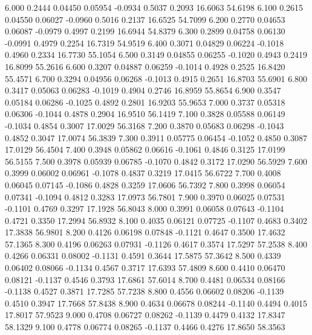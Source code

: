    6.000   0.2444   0.04450   0.05954  -0.0934   0.5037   0.2093  16.6063  54.6198
   6.100   0.2615   0.04550   0.06027  -0.0960   0.5016   0.2137  16.6525  54.7099
   6.200   0.2770   0.04653   0.06087  -0.0979   0.4997   0.2199  16.6944  54.8379
   6.300   0.2899   0.04758   0.06130  -0.0991   0.4979   0.2254  16.7319  54.9519
   6.400   0.3071   0.04829   0.06224  -0.1018   0.4960   0.2334  16.7730  55.1054
   6.500   0.3149   0.04855   0.06255  -0.1020   0.4943   0.2419  16.8099  55.2616
   6.600   0.3207   0.04887   0.06259  -0.1014   0.4928   0.2525  16.8420  55.4571
   6.700   0.3294   0.04956   0.06268  -0.1013   0.4915   0.2651  16.8703  55.6901
   6.800   0.3417   0.05063   0.06283  -0.1019   0.4904   0.2746  16.8959  55.8654
   6.900   0.3547   0.05184   0.06286  -0.1025   0.4892   0.2801  16.9203  55.9653
   7.000   0.3737   0.05318   0.06306  -0.1044   0.4878   0.2904  16.9510  56.1419
   7.100   0.3828   0.05588   0.06149  -0.1034   0.4854   0.3007  17.0029  56.3168
   7.200   0.3870   0.05683   0.06298  -0.1043   0.4852   0.3047  17.0074  56.3839
   7.300   0.3911   0.05775   0.06454  -0.1052   0.4850   0.3087  17.0129  56.4504
   7.400   0.3948   0.05862   0.06616  -0.1061   0.4846   0.3125  17.0199  56.5155
   7.500   0.3978   0.05939   0.06785  -0.1070   0.4842   0.3172  17.0290  56.5929
   7.600   0.3999   0.06002   0.06961  -0.1078   0.4837   0.3219  17.0415  56.6722
   7.700   0.4008   0.06045   0.07145  -0.1086   0.4828   0.3259  17.0606  56.7392
   7.800   0.3998   0.06054   0.07341  -0.1094   0.4812   0.3283  17.0973  56.7801
   7.900   0.3970   0.06025   0.07531  -0.1101   0.4769   0.3297  17.1928  56.8043
   8.000   0.3991   0.06058   0.07643  -0.1104   0.4721   0.3350  17.2994  56.8932
   8.100   0.4035   0.06121   0.07725  -0.1107   0.4683   0.3402  17.3838  56.9801
   8.200   0.4126   0.06198   0.07848  -0.1121   0.4647   0.3500  17.4632  57.1365
   8.300   0.4196   0.06263   0.07931  -0.1126   0.4617   0.3574  17.5297  57.2538
   8.400   0.4266   0.06331   0.08002  -0.1131   0.4591   0.3644  17.5875  57.3642
   8.500   0.4339   0.06402   0.08066  -0.1134   0.4567   0.3717  17.6393  57.4809
   8.600   0.4410   0.06470   0.08121  -0.1137   0.4546   0.3793  17.6861  57.6014
   8.700   0.4481   0.06534   0.08166  -0.1138   0.4527   0.3871  17.7285  57.7238
   8.800   0.4556   0.06602   0.08206  -0.1139   0.4510   0.3947  17.7668  57.8438
   8.900   0.4634   0.06678   0.08244  -0.1140   0.4494   0.4015  17.8017  57.9523
   9.000   0.4708   0.06727   0.08262  -0.1139   0.4479   0.4132  17.8347  58.1329
   9.100   0.4778   0.06774   0.08265  -0.1137   0.4466   0.4276  17.8650  58.3563
